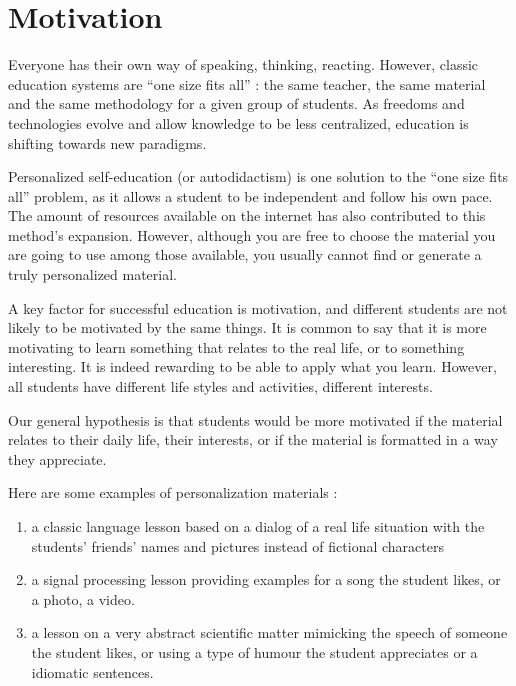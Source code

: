\documentclass[a4paper,12pt]{article}
\begin{document}
\maketitle
\tableofcontents
\newpage


\section{Motivation}

Everyone has their own way of speaking, thinking, reacting. However, classic education systems are ``one size fits all'' : the same teacher, the same material and the same methodology for a given group of students. As freedoms and technologies evolve and allow knowledge to be less centralized, education is shifting towards new paradigms.

Personalized self-education (or autodidactism) is one solution to the ``one size fits all'' problem, as it allows a student to be independent and follow his own pace. The amount of resources available on the internet has also contributed to this method's expansion. However, although you are free to choose the material you are going to use among those available, you usually cannot find or generate a truly personalized material.

A key factor for successful education is motivation, and different students are not likely to be motivated by the same things. It is common to say that it is more motivating to learn something that relates to the real life, or to something interesting. It is indeed rewarding to be able to apply what you learn. However, all students have different life styles and activities, different interests.

Our general hypothesis is that students would be more motivated if the material relates to their daily life, their interests, or if the material is formatted in a way they appreciate.

Here are some examples of personalization materials :

\begin{enumerate}
\item a classic language lesson based on a dialog of a real life situation with the students' friends' names and pictures instead of fictional characters
\item a signal processing lesson providing examples for a song the student likes, or a photo, a video.
\item a lesson on a very abstract scientific matter mimicking the speech of someone the student likes, or using a type of humour the student appreciates or a idiomatic sentences.
\end{enumerate}
\end{document}
